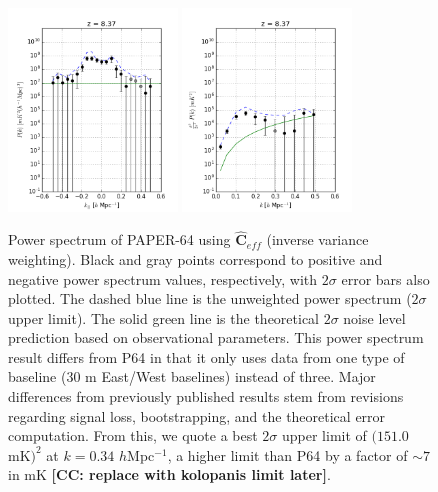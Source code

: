 \documentclass[preprint2,numberedappendix,tighten]{aastex6}  %
\newcommand{\cc}[1]{{\color{purple} \textbf{[CC: #1]}}}
\begin{document}
\begin{figure}
	\centering
	\includegraphics[width=0.4\textwidth]{plots/ps1_data_reg.png}
	\includegraphics[width=0.4\textwidth]{plots/ps2_data_reg.png}
	\caption{Power spectrum of PAPER-64 using $\hat{\textbf{C}}_{eff}$ (inverse variance weighting). Black and gray points correspond to positive and 
negative power spectrum values, respectively, with $2\sigma$ error bars also plotted. The dashed blue line is the unweighted 
power spectrum ($2\sigma$ upper limit). The solid green line is the theoretical $2\sigma$ noise level prediction based on 
observational parameters. This power spectrum result differs from P64 in that it only uses data from one type of baseline ($30$ m 
East/West baselines) instead of three. Major differences from previously published results stem from revisions regarding signal 
loss, bootstrapping, and the theoretical error computation. From this, we quote a best $2\sigma$ upper limit of $(151.0$ mK$)^{2}$ at 
$k=0.34$ $h$Mpc$^{-1}$, a higher limit than P64 by a factor of $\sim7$ in mK \cc{replace with kolopanis limit later}.}
	\label{fig:ps1_data}
\end{figure}
\end{document}
